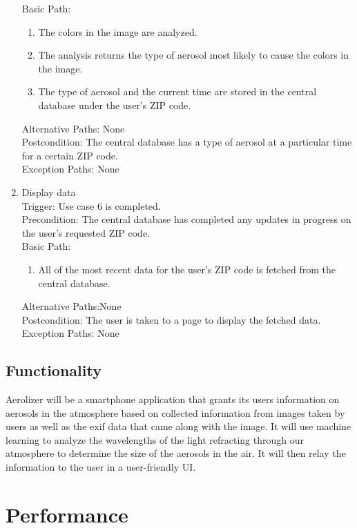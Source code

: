 \documentclass[journal,10pt,draftclsnofoot,onecolumn]{IEEEtran}
\begin{document}
\begin{singlespace}
\begin{enumerate}
		Basic Path:
		\begin{enumerate}
			\item The colors in the image are analyzed.
			\item The analysis returns the type of aerosol most likely to cause the colors in the image.
			\item The type of aerosol and the current time are stored in the central database under the user's ZIP code.
		\end{enumerate}
		Alternative Paths: None\\
		Postcondition: The central database has a type of aerosol at a particular time for a certain ZIP code.\\
		Exception Paths: None
	\\
	\item Display data\\
		Trigger: Use case 6 is completed.\\
		Precondition: The central database has completed any updates in progress on the user's requested ZIP code.\\
		Basic Path:
		\begin{enumerate}
			\item All of the most recent data for the user's ZIP code is fetched from the central database.
		\end{enumerate}
		Alternative Paths:None\\
		Postcondition: The user is taken to a page to display the fetched data.\\
		Exception Paths: None
\end{enumerate}

	\subsection{Functionality}
		Aerolizer will be a smartphone application that grants its users information on aerosols in the atmosphere based on collected information from images taken by users as well as the exif data that came along with the image.
		It will use machine learning to analyze the wavelengths of the light refracting through our atmosphere to determine the size of the aerosols in the air. It will then relay the information to the user in a user-friendly UI. 

\clearpage

\section{Performance}

\end{singlespace}
\end{document}

